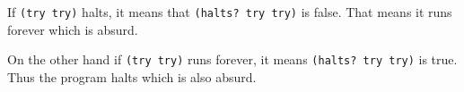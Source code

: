 \documentclass[a4paper,12pt]{article}
\begin{document}
If \lstinline!(try try)! halts, it means that \lstinline!(halts? try try)!
is false. That means it runs forever which is absurd.

On the other hand if \lstinline!(try try)! runs forever, it means
\lstinline!(halts? try try)! is true.  Thus the program halts which is
also absurd.
\end{document}

